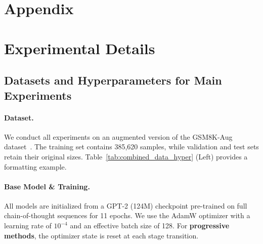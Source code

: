 \section*{Appendix}
\label{sec:appendix}

\section{Experimental Details}
\label{app:A}

\subsection{Datasets and Hyperparameters for Main Experiments}
\label{app:hyper}

\paragraph{Dataset.} We conduct all experiments on an augmented version of the GSM8K-Aug dataset~\citep{deng2023implicitchainthoughtreasoning}. The training set contains 385,620 samples, while validation and test sets retain their original sizes. Table~\ref{tab:combined_data_hyper} (Left) provides a formatting example.

\paragraph{Base Model \& Training.} All models are initialized from a GPT-2 (124M) checkpoint pre-trained on full chain-of-thought sequences for 11 epochs. We use the AdamW optimizer with a learning rate of $10^{-4}$ and an effective batch size of 128. For \textbf{progressive methods}, the optimizer state is reset at each stage transition.

